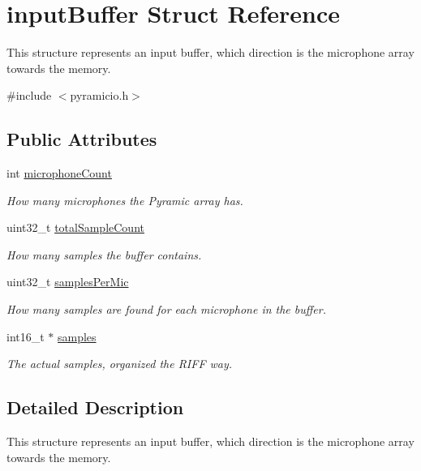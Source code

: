 \hypertarget{structinputBuffer}{}\section{input\+Buffer Struct Reference}
\label{structinputBuffer}


This structure represents an input buffer, which direction is the microphone array towards the memory.  




{\ttfamily \#include $<$pyramicio.\+h$>$}

\subsection*{Public Attributes}
\begin{DoxyCompactItemize}
\item 
int \hyperlink{structinputBuffer_a35bfb2e7cb4d0c0491f9efbe0273e455}{microphone\+Count}
\begin{DoxyCompactList}\small\item\em How many microphones the Pyramic array has. \end{DoxyCompactList}\item 
uint32\+\_\+t \hyperlink{structinputBuffer_a37bcaba2336dc42b37c4362e30483129}{total\+Sample\+Count}
\begin{DoxyCompactList}\small\item\em How many samples the buffer contains. \end{DoxyCompactList}\item 
uint32\+\_\+t \hyperlink{structinputBuffer_ab8b6a76bd2e891f34932e80268b66178}{samples\+Per\+Mic}
\begin{DoxyCompactList}\small\item\em How many samples are found for each microphone in the buffer. \end{DoxyCompactList}\item 
int16\+\_\+t $\ast$ \hyperlink{structinputBuffer_af6cdbaa4124d3e9db0272c19c94b2707}{samples}
\begin{DoxyCompactList}\small\item\em The actual samples, organized the R\+I\+FF way. \end{DoxyCompactList}\end{DoxyCompactItemize}


\subsection{Detailed Description}
This structure represents an input buffer, which direction is the microphone array towards the memory. 

